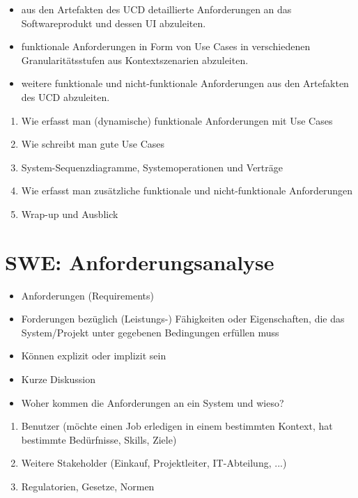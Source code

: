 \documentclass[10pt]{article}
\begin{document}
\begin{itemize}
  \item aus den Artefakten des UCD detaillierte Anforderungen an das Softwareprodukt und dessen UI abzuleiten.
  \item funktionale Anforderungen in Form von Use Cases in verschiedenen Granularitätsstufen aus Kontextszenarien abzuleiten.
  \item weitere funktionale und nicht-funktionale Anforderungen aus den Artefakten des UCD abzuleiten.
\end{itemize}

\begin{enumerate}
  \item Wie erfasst man (dynamische) funktionale Anforderungen mit Use Cases
  \item Wie schreibt man gute Use Cases
  \item System-Sequenzdiagramme, Systemoperationen und Verträge
  \item Wie erfasst man zusätzliche funktionale und nicht-funktionale Anforderungen
  \item Wrap-up und Ausblick
\end{enumerate}

\section*{SWE: Anforderungsanalyse}
\begin{itemize}
  \item Anforderungen (Requirements)
  \item Forderungen bezüglich (Leistungs-) Fähigkeiten oder Eigenschaften, die das System/Projekt unter gegebenen Bedingungen erfüllen muss
  \item Können explizit oder implizit sein
  \item Kurze Diskussion
  \item Woher kommen die Anforderungen an ein System und wieso?
\end{itemize}

\begin{enumerate}
  \item Benutzer (möchte einen Job erledigen in einem bestimmten Kontext, hat bestimmte Bedürfnisse, Skills, Ziele)
  \item Weitere Stakeholder (Einkauf, Projektleiter, IT-Abteilung, ...)
  \item Regulatorien, Gesetze, Normen
\end{enumerate}
\end{document}
